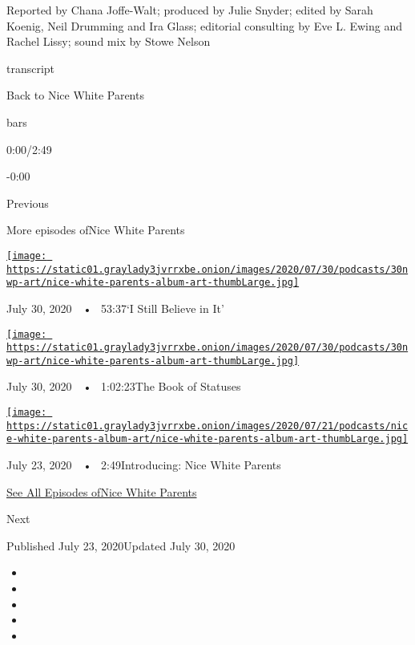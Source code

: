 Reported by Chana Joffe-Walt; produced by Julie Snyder; edited by Sarah
Koenig, Neil Drumming and Ira Glass; editorial consulting by Eve L.
Ewing and Rachel Lissy; sound mix by Stowe Nelson

transcript

Back to Nice White Parents

bars

0:00/2:49

-0:00

Previous

More episodes ofNice White Parents

\href{https://www.nytimes3xbfgragh.onion/2020/07/30/podcasts/nice-white-parents-serial-2.html?action=click\&module=audio-series-bar\&region=header\&pgtype=Article}{\texttt{[image: https://static01.graylady3jvrrxbe.onion/images/2020/07/30/podcasts/30nwp-art/nice-white-parents-album-art-thumbLarge.jpg]}}

July 30, 2020~~•~ 53:37`I Still Believe in It'

\href{https://www.nytimes3xbfgragh.onion/2020/07/30/podcasts/nice-white-parents-serial.html?action=click\&module=audio-series-bar\&region=header\&pgtype=Article}{\texttt{[image: https://static01.graylady3jvrrxbe.onion/images/2020/07/30/podcasts/30nwp-art/nice-white-parents-album-art-thumbLarge.jpg]}}

July 30, 2020~~•~ 1:02:23The Book of Statuses

\href{https://www.nytimes3xbfgragh.onion/2020/07/23/podcasts/nice-white-parents-serial.html?action=click\&module=audio-series-bar\&region=header\&pgtype=Article}{\texttt{[image: https://static01.graylady3jvrrxbe.onion/images/2020/07/21/podcasts/nice-white-parents-album-art/nice-white-parents-album-art-thumbLarge.jpg]}}

July 23, 2020~~•~ 2:49Introducing: Nice White Parents

\href{https://www.nytimes3xbfgragh.onion/column/nice-white-parents}{See
All Episodes ofNice White Parents}

Next

Published July 23, 2020Updated July 30, 2020

\begin{itemize}
\item
\item
\item
\item
\item
\end{itemize}

